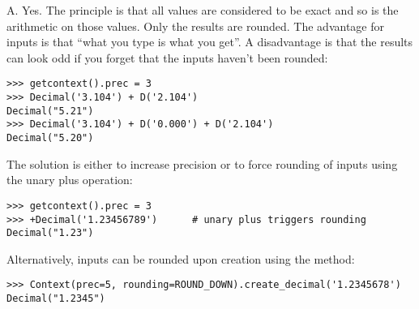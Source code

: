 A.  Yes.  The principle is that all values are considered to be exact and so
is the arithmetic on those values.  Only the results are rounded.  The
advantage for inputs is that ``what you type is what you get''.  A
disadvantage is that the results can look odd if you forget that the inputs
haven't been rounded:

\begin{verbatim}
>>> getcontext().prec = 3
>>> Decimal('3.104') + D('2.104')
Decimal("5.21")
>>> Decimal('3.104') + D('0.000') + D('2.104')
Decimal("5.20")
\end{verbatim}

The solution is either to increase precision or to force rounding of inputs
using the unary plus operation:

\begin{verbatim}
>>> getcontext().prec = 3
>>> +Decimal('1.23456789')      # unary plus triggers rounding
Decimal("1.23")
\end{verbatim}

Alternatively, inputs can be rounded upon creation using the
 method:

\begin{verbatim}
>>> Context(prec=5, rounding=ROUND_DOWN).create_decimal('1.2345678')
Decimal("1.2345")
\end{verbatim}
